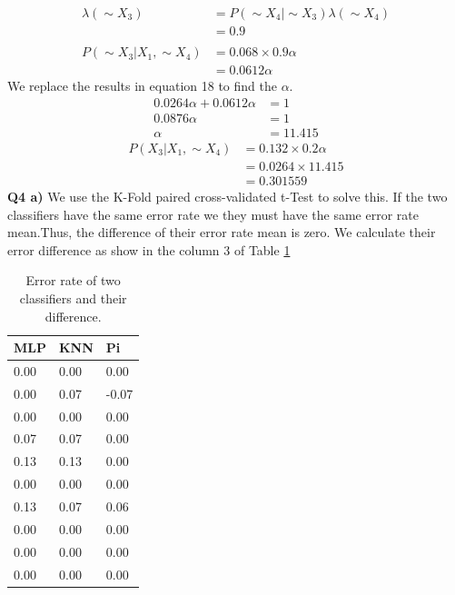\documentclass[12pt]{article}
\begin{document}
\begin{equation}
	\begin{aligned}
		\lambda (\sim X_3) &= P(\sim X_4 | \sim X_3)\lambda(\sim X_4) \\
		&= 0.9 \\ \\
		P(\sim X_3 | X_1, \sim X_4) &=0.068 \times 0.9 \alpha \\
		&= 0.0612 \alpha
	\end{aligned}
\end{equation}
We replace the results in equation 18 to find the $\alpha$.
\begin{equation}
	\begin{aligned}
		0.0264 \alpha + 0.0612 \alpha &= 1 \\
		0.0876 \alpha &= 1 \\
		\alpha &= 11.415
	\end{aligned}
\end{equation}
\begin{equation}
	\begin{aligned}
		P(X_3 | X_1, \sim X_4) &=0.132 \times 0.2 \alpha \\
		&= 0.0264 \times 11.415 \\
		&=0.301559
	\end{aligned}
\end{equation}
\textbf{Q4 a)}
We use the K-Fold paired cross-validated t-Test to solve this. If the two classifiers have the same error rate we they must have the same error rate mean.Thus, the difference of their error rate mean is zero. We calculate their error difference as show in the column 3 of Table \ref{error}

\begin{table}[h!]
	\centering
	\caption{Error rate of two classifiers and their difference.}
	\label{error}
	\begin{tabular}{|l|l|l|}
		\hline
		MLP  & KNN  & Pi    \\ \hline
		0.00 & 0.00 & 0.00  \\ \hline
		0.00 & 0.07 & -0.07 \\ \hline
		0.00 & 0.00 & 0.00  \\ \hline
		0.07 & 0.07 & 0.00  \\ \hline
		0.13 & 0.13 & 0.00  \\ \hline
		0.00 & 0.00 & 0.00  \\ \hline
		0.13 & 0.07 & 0.06  \\ \hline
		0.00 & 0.00 & 0.00  \\ \hline
		0.00 & 0.00 & 0.00  \\ \hline
		0.00 & 0.00 & 0.00  \\ \hline
	\end{tabular}
\end{table}
\end{document}
